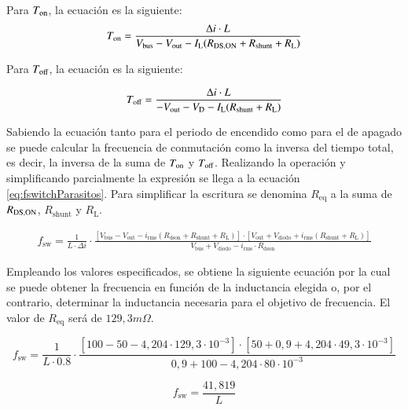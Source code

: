 \documentclass[12pt]{report} %
\begin{document}
Para $T_{\text{on}}$, la ecuación es la siguiente: 
\begin{equation}
    \label{eq:Ton}
    T_{\text{on}}= \frac{\Delta i \cdot L}{V_{\text{bus}} - V_{\text{out}}- I_{\text{L}} (R_{\text{DS,ON}}+R_\text{shunt}+R_\text{L})}
\end{equation}

Para $T_{\text{off}}$, la ecuación es la siguiente:

\begin{equation}
    \label{eq:Toff}
    T_{\text{off}}= \frac{\Delta i \cdot L}{-V_{\text{out}}- V_{\text{D}} - I_{\text{L}} (R_\text{shunt}+R_\text{L})}
\end{equation}

Sabiendo la ecuación tanto para el periodo de encendido como para el de apagado se puede calcular la frecuencia de conmutación como la inversa del tiempo total, es decir, la inversa de la suma de $T_{\text{on}}$ y $T_{\text{off}}$. Realizando la operación y simplificando parcialmente la expresión se llega a la ecuación \ref{eq:fswitchParasitos}. Para simplificar la escritura se denomina $R_\text{eq}$ a la suma de $R_{\text{DS,ON}}$, $R_{\text{shunt}}$ y $R_\text{L}$.

\begin{equation}
    \label{eq:fswitchParasitos}
    \begin{split}
     f_{\text{sw}} = \frac{1}{L \cdot \Delta i} \cdot \frac{[V_{\text{bus}} - V_{\text{out}} - i_{\text{rms}}(R_{\text{dson}} + R_{\text{shunt}} + R_{\text{L}})] \cdot [V_{\text{out}} + V_{\text{diodo}} + i_{\text{rms}}(R_{\text{shunt}} + R_{\text{L}})]}{V_{\text{bus}} + V_{\text{diodo}} - i_{\text{rms}} \cdot R_{\text{dson}}}
  \end{split}
\end{equation}

Empleando los valores especificados, se obtiene la siguiente ecuación por la cual se puede obtener la frecuencia en función de la inductancia elegida o, por el contrario, determinar la inductancia necesaria para el objetivo de frecuencia. El valor de $R_\text{eq}$ será de $129{,}3 m\Omega$. 

\begin{equation}
    \label{eq:fswitchParasitosValores}
     f_{\text{sw}} = \frac{1}{L \cdot 0.8} \cdot \frac{\left[ 100 - 50 - 4{,}204 \cdot 129{,}3 \cdot 10^{-3} \right] \cdot \left[ 50 + 0{,}9 + 4{,}204 \cdot 49{,}3 \cdot 10^{-3} \right]}{0{,}9 + 100 - 4{,}204 \cdot 80 \cdot 10^{-3}} 
\end{equation}

\begin{equation}
    \label{eq:fswitchfunciondeL}
    f_{\text{sw}} = \frac{41{,}819}{L}
\end{equation}
\end{document}
